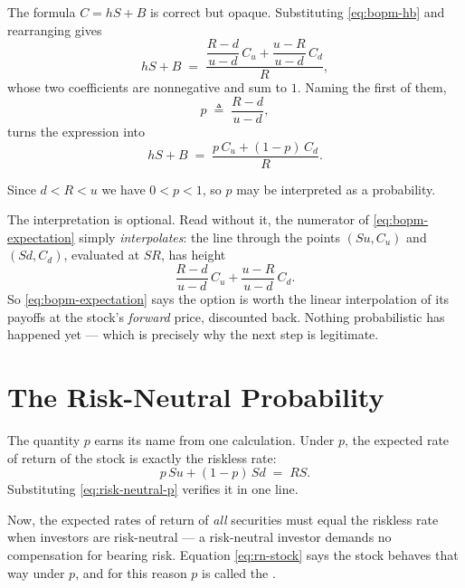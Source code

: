 
\suppstart
The formula $C=hS+B$ is correct but opaque.
\suppend
Substituting \eqref{eq:bopm-hb} and rearranging gives
\[
	hS+B \;=\; \frac{\dfrac{R-d}{u-d}\,C_{u} + \dfrac{u-R}{u-d}\,C_{d}}{R} ,
\]
\suppstart
whose two coefficients are nonnegative and sum to $1$.
\suppend
Naming the first of them,
\begin{equation}
	p \;\triangleq\; \frac{R-d}{u-d} ,
	\label{eq:risk-neutral-p}
\end{equation}
turns the expression into
\begin{equation}
	hS+B \;=\; \frac{p\,C_{u}+(1-p)\,C_{d}}{R} .
	\label{eq:bopm-expectation}
\end{equation}

Since $d<R<u$ we have $0<p<1$, so $p$ may be interpreted as a probability.

\begin{note}
	\suppstart
	The interpretation is optional.
	\suppend
	Read without it, the numerator of \eqref{eq:bopm-expectation} simply \emph{interpolates}: the line through the points $(Su,C_{u})$ and $(Sd,C_{d})$, evaluated at $SR$, has height
	\[
		\frac{R-d}{u-d}\,C_{u} + \frac{u-R}{u-d}\,C_{d} .
	\]
	\suppstart
	So \eqref{eq:bopm-expectation} says the option is worth the linear interpolation of its payoffs at the stock's \emph{forward} price, discounted back.
	Nothing probabilistic has happened yet --- which is precisely why the next step is legitimate.
	\suppend
\end{note}

\section{The Risk-Neutral Probability}
\label{sec:risk-neutral-prob}


\suppstart
The quantity $p$ earns its name from one calculation.
\suppend
Under $p$, the expected rate of return of the stock is exactly the riskless rate:
\begin{equation}
	p\,Su+(1-p)\,Sd \;=\; RS .
	\label{eq:rn-stock}
\end{equation}
\suppstart
Substituting \eqref{eq:risk-neutral-p} verifies it in one line.
\suppend

Now, the expected rates of return of \emph{all} securities must equal the riskless rate when investors are risk-neutral --- a risk-neutral investor demands no compensation for bearing risk.
Equation \eqref{eq:rn-stock} says the stock behaves that way under $p$, and for this reason $p$ is called the .

